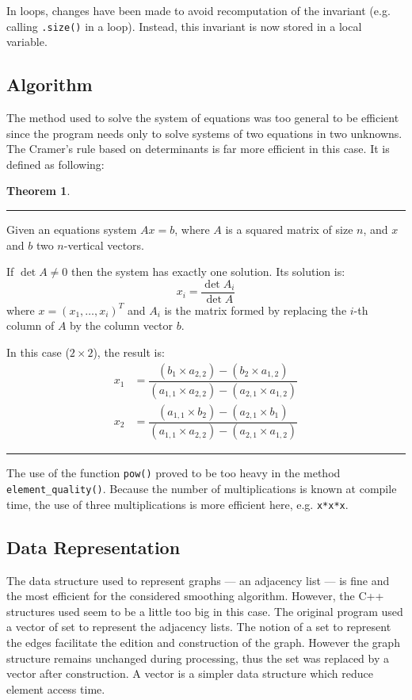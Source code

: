 \documentclass[fleqn,11pt]{SelfArx} %
\theoremstyle{definition}
\newtheorem{theorem}{Theorem}
\begin{document}
In loops, changes have been made to avoid recomputation of the invariant (e.g. calling \verb+.size()+ in a loop). Instead, this invariant is now stored in a local variable.

\subsection{Algorithm}

The method used to solve the system of equations was too general to be efficient since the program needs only to solve systems of two equations in two unknowns. The Cramer's rule based on determinants is far more efficient in this case. It is defined as following:

\begin{theorem}
\hrule \vspace*{1pt}
Given an equations system $Ax = b$, where $A$ is a squared matrix of size $n$, and $x$ and $b$ two $n$-vertical vectors.

If $\det A \neq 0$ then the system has exactly one solution. Its solution is:
\[x_i = \dfrac{\det A_i}{\det A}\]
where $x = (x_1,\dots,x_i)^T$ and $A_i$ is the matrix formed by replacing the $i$-th column of $A$  by the column vector $b$. 

In this case ($2\times2$), the result is:
\begin{align*}
x_1 &= \dfrac{(b_1 \times a_{2,2}) - (b_2 \times a_{1,2})}{(a_{1,1} \times a_{2,2}) - (a_{2,1} \times a_{1,2})} \\
x_2 &= \dfrac{(a_{1,1} \times b_2) - (a_{2,1} \times b_1)}{(a_{1,1} \times a_{2,2}) - (a_{2,1} \times a_{1,2})}
\end{align*}
\hrule
\end{theorem}

The use of the function \verb+pow()+ proved to be too heavy in the method \verb+element_quality()+. Because the number of multiplications is known at compile time, the use of three multiplications is more efficient here, e.g. \verb+x*x*x+.

\subsection{Data Representation}

The data structure used to represent graphs --- an adjacency list --- is fine and the most efficient for the considered smoothing algorithm. However, the C++ structures used seem to be a little too big in this case. The original program used a vector of set to represent the adjacency lists. The notion of a set to represent the edges facilitate the edition and construction of the graph. However the graph structure remains unchanged during processing, thus the set was replaced by a vector after construction. A vector is a simpler data structure which reduce element access time.
\end{document}
